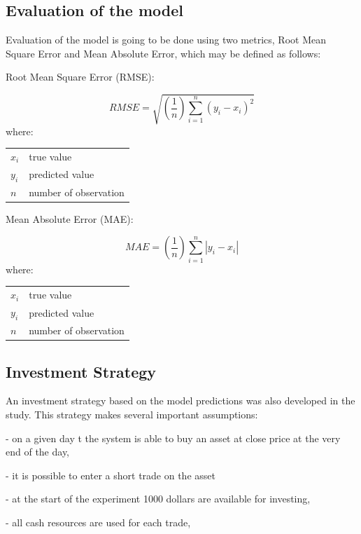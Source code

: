 \documentclass[11pt]{article} %
\makeatletter
\newenvironment{conditions}
  {\par\vspace{\abovedisplayskip}\noindent\begin{tabular}{>{$}l<{$} @{${}={}$} l}}
  {\end{tabular}\par\vspace{\belowdisplayskip}}
\makeatother
\begin{document}
\subsection{Evaluation of the model}

Evaluation of the model is going to be done using two metrics, Root Mean Square Error and Mean Absolute Error, which may be defined as follows:  \\ 

\begin{center}   Root Mean Square Error (RMSE):  \end{center}
\begin{equation}  RMSE = \sqrt{(\frac{1}{n})\sum_{i=1}^{n}(y_{i} - x_{i})^{2}} \end{equation}
where:
\begin{conditions}
 x_i     &  true value \\
 y_i     &  predicted value \\   
 n &  number of observation
\end{conditions}

\begin{center}  Mean Absolute Error (MAE): \end{center}
\begin{equation} MAE =(\frac{1}{n})\sum_{i=1}^{n}\left | y_{i} - x_{i} \right | \end{equation}
where:
\begin{conditions}
 x_i     &  true value \\
 y_i     &  predicted value \\   
 n &  number of observation
\end{conditions}

\subsection{Investment Strategy}

An investment strategy based on the model predictions was also developed in the study. This strategy makes several important assumptions:
 
\noindent- on a given day t the system is able to buy an asset at close price at the very end of the day,

\noindent- it is possible to enter a short trade on the asset

\noindent- at the start of the experiment 1000 dollars are available for investing,  

\noindent- all cash resources are used for each trade, 
\end{document}
